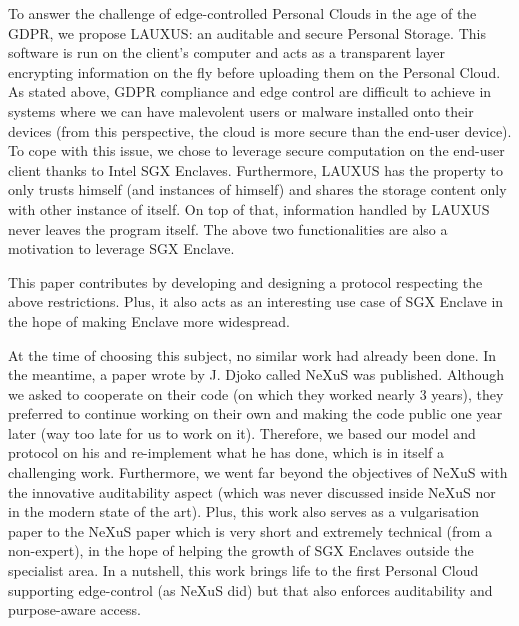 \documentclass[../main.tex]{subfiles}
\begin{document}
\medbreak
\par To answer the challenge of edge-controlled Personal Clouds in the age of the GDPR, we propose LAUXUS: an auditable and secure Personal Storage. This software is run on the client's computer and acts as a transparent layer encrypting information on the fly before uploading them on the Personal Cloud. As stated above, GDPR compliance and edge control are difficult to achieve in systems where we can have malevolent users or malware installed onto their devices (from this perspective, the cloud is more secure than the end-user device). To cope with this issue, we chose to leverage secure computation on the end-user client thanks to Intel SGX Enclaves. Furthermore, LAUXUS has the property to only trusts himself (and instances of himself) and shares the storage content only with other instance of itself. On top of that, information handled by LAUXUS never leaves the program itself. The above two functionalities are also a motivation to leverage SGX Enclave.
\par This paper contributes by developing and designing a protocol respecting the above restrictions. Plus, it also acts as an interesting use case of SGX Enclave in the hope of making Enclave more widespread.
\par At the time of choosing this subject, no similar work had already been done. In the meantime, a paper wrote by J. Djoko called NeXuS\cite{djoko2019nexus} was published. Although we asked to cooperate on their code (on which they worked nearly 3 years), they preferred to continue working on their own and making the code public one year later (way too late for us to work on it). Therefore, we based our model and protocol on his and re-implement what he has done, which is in itself a challenging work.  Furthermore, we went far beyond the objectives of NeXuS with the innovative auditability aspect (which was never discussed inside NeXuS nor in the modern state of the art). Plus, this work also serves as a vulgarisation paper to the NeXuS paper which is very short and extremely technical (from a non-expert), in the hope of helping the growth of SGX Enclaves outside the specialist area. In a nutshell, this work brings life to the first Personal Cloud supporting edge-control (as NeXuS did) but that also enforces auditability and purpose-aware access.
\end{document}
